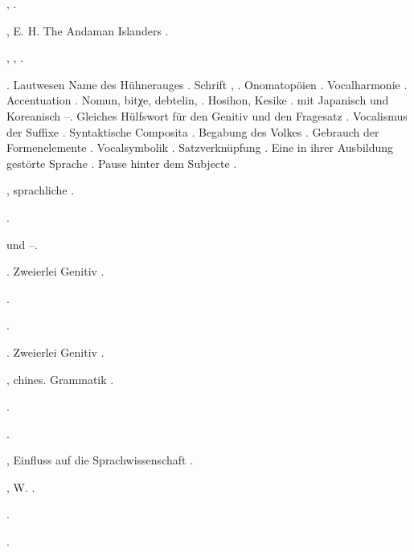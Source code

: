 \begin{register}

,  \pageref{sp.147}.

, E. H. The Andaman Islanders \pageref{sp.442}. 

,  \pageref{sp.150}, \pageref{sp.282}.

. Lautwesen \pageref{sp.34} Name des Hühnerauges \pageref{sp.41}. Schrift \pageref{sp.129}, \pageref{sp.131}. Onomatopöien \pageref{sp.154}. Vocalharmonie \pageref{sp.199}. Accentuation \pageref{sp.212}. Nomun, bitχe, debtelin,  \pageref{sp.264}. Hosihon, Kesike \pageref{sp.267}.  mit Japanisch und Koreanisch \pageref{sp.289}–\pageref{sp.290}. Gleiches Hülfswort für den Genitiv und den Fragesatz \pageref{sp.347}. Vocalismus der Suffixe \pageref{sp.352}. Syntaktische Composita \pageref{sp.359}. Begabung des Volkes \pageref{sp.389}. Gebrauch der Formenelemente \pageref{sp.381}. Vocalsymbolik \pageref{sp.408}. Satzverknüpfung \pageref{sp.418}. Eine in ihrer Ausbildung gestörte Sprache \pageref{sp.427}. Pause hinter dem Subjecte \pageref{sp.455}.

, sprachliche \pageref{sp.275}.

 \pageref{sp.257}.

 und  \pageref{sp.248}–\pageref{sp.249}.

. Zweierlei Genitiv \pageref{sp.463}.

 \pageref{sp.280}.

 \pageref{sp.280}.

. Zweierlei Genitiv \pageref{sp.463}.


, chines. Grammatik \pageref{sp.25}.

 \pageref{sp.22}.

 \pageref{sp.107}.

, Einfluss auf die Sprachwissenschaft \pageref{sp.15}.

, W. \pageref{sp.194}.

 \pageref{sp.383}\sed{, \pageref{sp.389}}.

 \pageref{sp.258}. 


\end{register}
